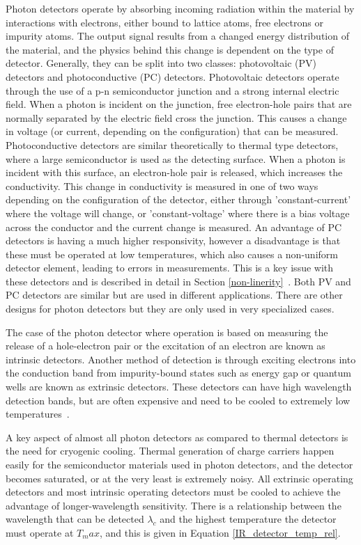 Photon detectors operate by absorbing incoming radiation within the material by interactions with electrons, either bound to lattice atoms, free electrons or impurity atoms. The output signal results from a changed energy distribution of the material, and the physics behind this change is dependent on the type of detector. Generally, they can be split into two classes: photovoltaic (PV) detectors and photoconductive (PC) detectors. Photovoltaic detectors operate through the use of a p-n semiconductor junction and a strong internal electric field. When a photon is incident on the junction, free electron-hole pairs that are normally separated by the electric field cross the junction. This causes a change in voltage (or current, depending on the configuration) that can be measured. Photoconductive detectors are similar theoretically to thermal type detectors, where a large semiconductor is used as the detecting surface. When a photon is incident with this surface, an electron-hole pair is released, which increases the conductivity. This change in conductivity is measured in one of two ways depending on the configuration of the detector, either through 'constant-current' where the voltage will change, or 'constant-voltage' where there is a bias voltage across the conductor and the current change is measured. An advantage of PC detectors is having a much higher responsivity, however a disadvantage is that these must be operated at low temperatures, which also causes a non-uniform detector element, leading to errors in measurements. This is a key issue with these detectors and is described in detail in Section \ref{non-linerity}~\citep{IR_detector_textbook}. Both PV and PC detectors are similar but are used in different applications. There are other designs for photon detectors but they are only used in very specialized cases.

The case of the photon detector where operation is based on measuring the release of a hole-electron pair or the excitation of an electron are known as intrinsic detectors. Another method of detection is through exciting electrons into the conduction band from impurity-bound states such as energy gap or quantum wells are known as extrinsic detectors. These detectors can have high wavelength detection bands, but are often expensive and need to be cooled to extremely low temperatures~\citep{IR_detector_textbook}.

A key aspect of almost all photon detectors as compared to thermal detectors is the need for cryogenic cooling. Thermal generation of charge carriers happen easily for the semiconductor materials used in photon detectors, and the detector becomes saturated, or at the very least is extremely noisy. All extrinsic operating detectors and most intrinsic operating detectors must be cooled to achieve the advantage of longer-wavelength sensitivity. There is a relationship between the wavelength that can be detected $\lambda_c$ and the highest temperature the detector must operate at $T_max$, and this is given in Equation \ref{IR_detector_temp_rel}.

